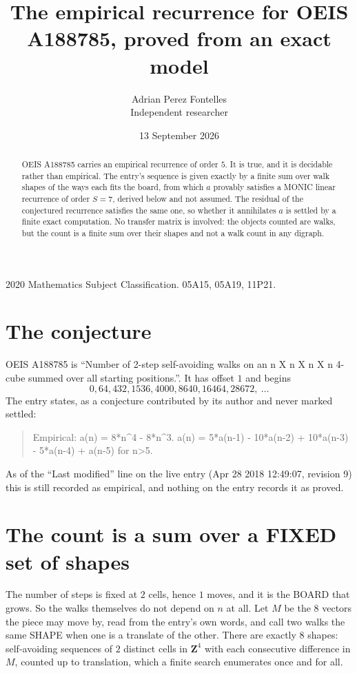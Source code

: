 \documentclass[11pt,a4paper]{article}
\title{The empirical recurrence for OEIS A188785, proved from an exact model}
\author{Adrian Perez Fontelles\\ \small Independent researcher}
\date{13 September 2026}
\theoremstyle{plain}
\theoremstyle{definition}
\begin{document}
\maketitle

\begin{abstract}
OEIS A188785 carries an empirical recurrence of order $5$. It is true, and it is
decidable rather than empirical. The entry's sequence is given exactly by a finite sum over walk shapes of the ways each fits the board, from
which $a$ provably satisfies a MONIC linear recurrence of order $S=7$, derived below and not
assumed. The residual of the conjectured recurrence satisfies the same one, so whether it
annihilates $a$ is settled by a finite exact computation. No transfer matrix is involved: the objects counted are walks, but the count is a finite sum over their shapes and not a walk count in any digraph.
\end{abstract}

\noindent\small 2020 Mathematics Subject Classification. 05A15, 05A19, 11P21.\normalsize

\section{The conjecture}

OEIS A188785 is ``Number of 2-step self-avoiding walks on an n X n X n X n 4-cube summed over all starting positions.''. It has offset $1$ and begins
\[
0, 64, 432, 1536, 4000, 8640, 16464, 28672,\ \dots
\]
The entry states, as a conjecture contributed by its author and never marked settled:
\begin{quote}
Empirical: a(n) = 8*n\^{}4 - 8*n\^{}3. a(n) = 5*a(n-1) - 10*a(n-2) + 10*a(n-3) - 5*a(n-4) + a(n-5) for n>5.
\end{quote}
As of the ``Last modified'' line on the live entry (Apr 28 2018 12:49:07, revision 9)
this is still recorded as empirical, and nothing on the entry records it as proved.

\section{The count is a sum over a FIXED set of shapes}

The number of steps is fixed at $2$ cells, hence $1$ moves, and it is the BOARD
that grows. So the walks themselves do not depend on $n$ at all. Let $M$ be the $8$
vectors the piece may move by, read from the entry's own words, and call two walks the same
SHAPE when one is a translate of the other. There are exactly $8$ shapes: self-avoiding
sequences of $2$ distinct cells in $\mathbf{Z}^{4}$ with each consecutive difference in
$M$, counted up to translation, which a finite search enumerates once and for all.
\end{document}
